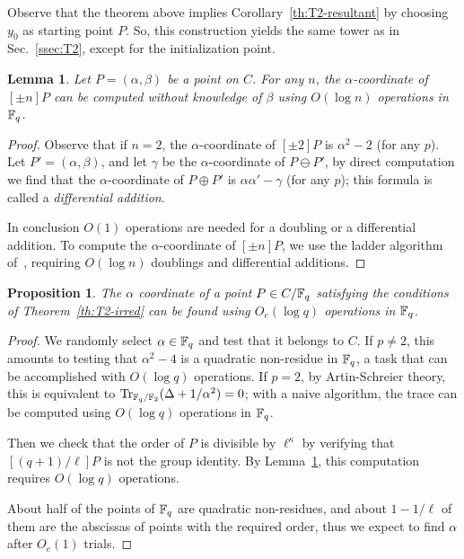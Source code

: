\documentclass{sig-alternate}
\newtheorem{lemma}[definition]{Lemma}
\newtheorem{proposition}[definition]{Proposition}
\begin{document}
Observe that the theorem above implies Corollary~\ref{th:T2-resultant}
by choosing $y_0$ as starting point $P$. So, this construction yields
the same tower as in Sec.~\ref{ssec:T2}, except for the initialization
point.

\begin{lemma}
  \label{th:montgomery}
  Let $P=(\alpha,\beta)$ be a point on $C$. For any $n$, the
  $\alpha$-coordinate of $[\pm n]P$ can be computed without knowledge of
  $\beta$ using $O(\log n)$ operations in $\mathbb{F}_q$.
\end{lemma}
\begin{proof}
  Observe that if $n=2$, the $\alpha$-coordinate of $[\pm 2]P$ is
  $\alpha^2-2$ (for any $p$).  Let $P'=(\alpha,\beta)$, and let
  $\gamma$ be the $\alpha$-coordinate of $P\ominus P'$, by direct
  computation we find that the $\alpha$-coordinate of $P\oplus P'$ is
  $\alpha\alpha'-\gamma$ (for any $p$); this formula is called a
  \emph{differential addition}.

  In conclusion $O(1)$ operations are needed for a doubling or a
  differential addition. To compute the $\alpha$-coordinate of $[\pm
  n]P$, we use the ladder algorithm of~\cite{montgomery}, requiring
  $O(\log n)$ doublings and differential additions.
\end{proof}

\begin{proposition}
  The $\alpha$ coordinate of a point $P\in C/\mathbb{F}_q$ satisfying the
  conditions of Theorem~\ref{th:T2-irred} can be found using $O_e(\log
  q)$ operations in $\mathbb{F}_q$.
\end{proposition}
\begin{proof}
  We randomly select $\alpha\in\mathbb{F}_q$ and test that it belongs to
  $C$. If $p\ne2$, this amounts to testing that $\alpha^2-4$ is a
  quadratic non-residue in $\mathbb{F}_q$, a task that can be accomplished
  with $O(\log q)$ operations. If $p=2$, by Artin-Schreier theory,
  this is equivalent to $\operatorname{Tr}_{\mathbb{F}_q/\mathbb{F}_2}(\Delta+1/\alpha^2)=0$; with a
  naive algorithm, the trace can be computed using $O(\log q)$
  operations in $\mathbb{F}_q$.

  Then we check that the order of $P$ is divisible by $\ell^\kappa$ by
  verifying that $[(q+1)/\ell]P$ is not the group identity. By
  Lemma~\ref{th:montgomery}, this computation requires $O(\log q)$
  operations.

  About half of the points of $\mathbb{F}_q$ are quadratic non-residues, and
  about $1-1/\ell$ of them are the abscissas of points with the
  required order, thus we expect to find $\alpha$ after $O_e(1)$ trials.
\end{proof}
\end{document}

